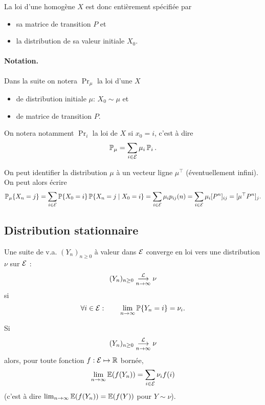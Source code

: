 \remark
La loi d'une \cM homogène $X$ est donc entièrement spécifiée par
\begin{itemize}
  \item sa matrice de transition $P$ et
  \item la distribution de sa valeur initiale $X_0$.
\end{itemize}

\paragraph*{Notation.}
Dans la suite on notera $\Pr_\mu$ la loi d'une \cM $X$
\begin{itemize}
  \item de distribution initiale $\mu$: $X_0 \sim \mu$ et
  \item de matrice de transition $P$.
\end{itemize}
On notera notamment $\Pr_i$ la loi de $X$ si $x_0 = i$, c'est à dire
$$
\operatorname{\mathbb{P}}_\mu = \sum_{i \in \mathcal{E}} \mu_i \operatorname{\mathbb{P}}_i.
$$

\remark
On peut identifier la distribution $\mu$ à un vecteur ligne $\mu^\top$ (éventuellement infini). On peut alors écrire
$$
\operatorname{\mathbb{P}}_\mu\{X_n = j\} 
= \sum_{i \in \mathcal{E}} \operatorname{\mathbb{P}}\{X_0 = i\} \operatorname{\mathbb{P}}\{X_n = j \mid X_0 = i\}
= \sum_{i \in \mathcal{E}} \mu_i p_{ij}(n)
= \sum_{i \in \mathcal{E}} \mu_i [P^n]_{ij}
= [\mu^\top P^n]_j.
$$

\subsection{Distribution stationnaire}  

\begin{definition}
  Une suite de v.a. $(Y_n)_{n \geq 0}$ à valeur dans $\mathcal{E}$ converge en loi vers une distribution $\nu$ sur $\mathcal{E}$ :
  $$
  (Y_n)_{n \geq 0} \overset{\mathcal{L}}{\underset{n \rightarrow \infty}{\longrightarrow}} \nu
  $$
  si
  $$
  \forall i \in \mathcal{E}: \qquad \lim_{n \rightarrow \infty} \operatorname{\mathbb{P}}\{Y_n = i\} = \nu_i.
  $$
\end{definition}

\begin{proposition} \label{prop:convergenceEsperance}
  Si
  $$
  (Y_n)_{n \geq 0} \overset{\mathcal{L}}{\underset{n \rightarrow \infty}{\longrightarrow}} \nu
  $$
  alors, pour toute fonction $f : \mathcal{E} \mapsto \mathbb{R}$ bornée, 
  $$
  \lim_{n \rightarrow \infty} \operatorname{\mathbb{E}}(f(Y_n)) = \sum_{i \in \mathcal{E}} \nu_i f(i)
  $$
  (c'est à dire $\lim_{n \rightarrow \infty} \operatorname{\mathbb{E}}(f(Y_n)) = \operatorname{\mathbb{E}}(f(Y))$ pour $Y \sim \nu$).
\end{proposition}

